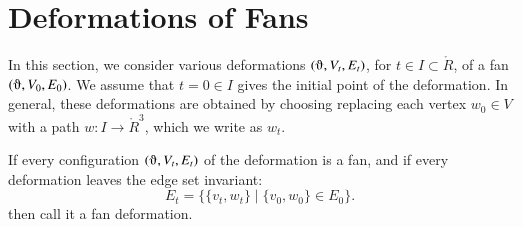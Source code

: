 %
%
%
%

\section{Deformations of Fans}

In this section, we consider various deformations $(\orgn,V_t,E_t)$,
for $t\in I\subset \ring{R}$, of
a fan $(\orgn,V_0,E_0)$.  
We assume that $t=0\in I$ gives the initial point
of the deformation.  
In general, these deformations
are obtained by choosing replacing each vertex $w_0\in V$
with a path $w:I\to \ring{R}^3$, which we write as $w_t$.  

\begin{definition}
If every configuration $(\orgn,V_t,E_t)$ of the 
deformation is a fan, and if
 every deformation
leaves the edge set invariant:
   \begin{equation}\label{eqn:edge}
   E_t = \{ \{v_t,w_t\} \mid \{v_0,w_0\}\in E_0\}.
   \end{equation}
then call it a
fan deformation.
\end{definition}

